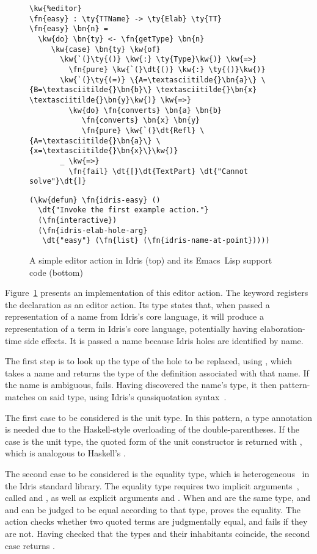 \begin{figure}[b]
\begin{Verbatim}
\kw{%editor}
\fn{easy} : \ty{TTName} -> \ty{Elab} \ty{TT}
\fn{easy} \bn{n} =
  \kw{do} \bn{ty} <- \fn{getType} \bn{n}
     \kw{case} \bn{ty} \kw{of}
       \kw{`(}\ty{()} \kw{:} \ty{Type}\kw{)} \kw{=>}
         \fn{pure} \kw{`(}\dt{()} \kw{:} \ty{()}\kw{)}
       \kw{`(}\ty{(=)} \{A=\textasciitilde{}\bn{a}\} \{B=\textasciitilde{}\bn{b}\} \textasciitilde{}\bn{x} \textasciitilde{}\bn{y}\kw{)} \kw{=>}
         \kw{do} \fn{converts} \bn{a} \bn{b}
            \fn{converts} \bn{x} \bn{y}
            \fn{pure} \kw{`(}\dt{Refl} \{A=\textasciitilde{}\bn{a}\} \{x=\textasciitilde{}\bn{x}\}\kw{)}
       _ \kw{=>}
         \fn{fail} \dt{[}\dt{TextPart} \dt{"Cannot solve"}\dt{]}
\end{Verbatim}
\hrulefill
\begin{Verbatim}
(\kw{defun} \fn{idris-easy} ()
  \dt{"Invoke the first example action."}
  (\fn{interactive})
  (\fn{idris-elab-hole-arg}
   \dt{"easy"} (\fn{list} (\fn{idris-name-at-point}))))
\end{Verbatim}
  \caption{A simple editor action in Idris (top) and its \mbox{Emacs Lisp} support code (bottom)}
  \label{fig:motivating-example}
\end{figure}

Figure~\ref{fig:motivating-example} presents an implementation of this
editor action. The  keyword registers the declaration as
an editor action. Its type states that, when passed a representation
of a name from Idris's core language, it will produce a representation
of a term in Idris's core language, potentially having
elaboration-time side effects. It is passed a name because Idris holes
are identified by name.

The first step is to look up the type of the hole to be replaced,
using , which takes a name and returns the type of the definition
associated with that name.
If the name is ambiguous,  fails.  Having discovered the name's
type, it then pattern-matches on said type, using Idris's quasiquotation
syntax~\citep{idrisQuotation}.

The first case to be considered is the unit type. In this pattern, a
type annotation is needed due to the Haskell-style overloading of the
double-parentheses. If the case is the unit type, the quoted form of
the unit constructor is returned with , which is analogous to
Haskell's .

The second case to be considered is the equality type, which is
heterogeneous~\citep{mcbridephd} in the Idris standard library.  The
equality type requires two implicit arguments~\citep{pollack}, called
 and , as well as explicit arguments  and .
When  and  are the same type, and  and 
can be judged to be equal according to that type,  proves the
equality. The  action checks whether two quoted terms are
judgmentally equal, and fails if they are not. Having checked that the
types and their inhabitants coincide, the second case returns .


